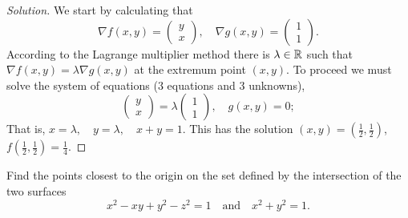 \begin{proof}[Solution]
    We start by calculating that
    \[
        \nabla f(x,y) = \left(\begin{smallmatrix}
                y\\ x
            \end{smallmatrix}\right),
        \quad
        \nabla g(x,y) = \left(\begin{smallmatrix}
                1\\ 1
            \end{smallmatrix}\right).
    \]
    According to the Lagrange multiplier method there is \(\lambda\in \mathbb{R}\) such that \(\nabla f(x,y) = \lambda \nabla g(x,y)\) at the extremum point \((x,y)\).
    To proceed we must solve the system of equations (3 equations and 3 unknowns),
    \[
        \left(\begin{smallmatrix}
                y\\ x
            \end{smallmatrix}\right)
        = \lambda \left(\begin{smallmatrix}
                1\\ 1
            \end{smallmatrix}\right),
        \quad g(x,y) =0;
    \]
    That is,
    \( x = \lambda, \quad
    y = \lambda, \quad
    x+y = 1
    \).
    This has the solution \((x,y) = (\frac{1}{2},\frac{1}{2})\), \(f(\frac{1}{2},\frac{1}{2})= \frac{1}{4}\).
\end{proof}



\begin{task}
    Find the points closest to the origin on the set defined by the intersection of the two surfaces
    \[
        x^2 - xy + y^2 - z^2 = 1
        \quad \text{and} \quad
        x^2 + y^2 = 1.
    \]
\end{task}

